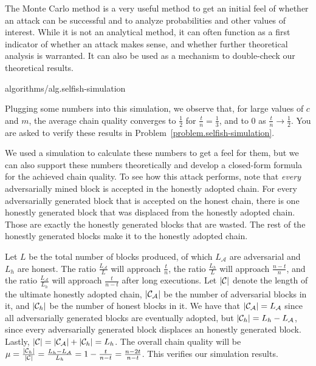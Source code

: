 The Monte Carlo method is a very useful method to get an initial feel of whether
an attack can be successful and to analyze probabilities and other values of interest.
While it is not an analytical method, it can often function as a first indicator
of whether an attack makes sense, and whether further theoretical analysis is warranted.
It can also be used as a mechanism to double-check our theoretical results.

{algorithms/alg.selfish-simulation}

Plugging some numbers into this simulation, we observe that, for large values of $c$
and $m$, the average chain quality converges to $\frac{1}{2}$ for $\frac{t}{n} = \frac{1}{3}$,
and to $0$ as $\frac{t}{n} \rightarrow \frac{1}{2}$. You are asked to verify these
results in Problem~\ref{problem.selfish-simulation}.

We used a simulation to calculate these numbers to get a feel for them, but we can also
support these numbers theoretically and develop a closed-form formula for the achieved
chain quality. To see how this attack performs, note that \emph{every} adversarially
mined block is accepted in the honestly adopted chain. For every adversarially generated
block that is accepted on the honest chain, there is one honestly generated block that
was displaced from the honestly adopted chain. Those are exactly the honestly generated
blocks that are wasted. The rest of the honestly generated blocks make it to the honestly
adopted chain.

Let $L$ be the total number of blocks produced, of which $L_\mathcal{A}$ are
adversarial and $L_h$ are honest. The ratio $\frac{L_\mathcal{A}}{L}$ will
approach $\frac{t}{n}$, the ratio $\frac{L_h}{L}$ will approach
$\frac{n - t}{n}$, and the ratio $\frac{L_\mathcal{A}}{L_h}$
will approach $\frac{t}{n - t}$ after long executions.
Let $|\mathcal{C}|$ denote the length of the
ultimate honestly adopted chain, $|\mathcal{C}_\mathcal{A}|$ be the number of
adversarial blocks in it, and $|\mathcal{C}_h|$ be the number of honest blocks
in it. We have that $|\mathcal{C}_\mathcal{A}| = L_\mathcal{A}$ since all
adversarially generated blocks are eventually adopted, but
$|\mathcal{C}_h| = L_h - L_\mathcal{A}$, since every adversarially generated
block displaces an honestly generated block. Lastly,
$|\mathcal{C}| = |\mathcal{C}_\mathcal{A}| + |\mathcal{C}_h| = L_h$.
The overall chain quality will be
$\mu = \frac{|\mathcal{C}_h|}{|\mathcal{C}|} = \frac{L_h - L_\mathcal{A}}{L_h} = 1 - \frac{t}{n - t} = \frac{n - 2t}{n - t}$.
This verifies our simulation results.

